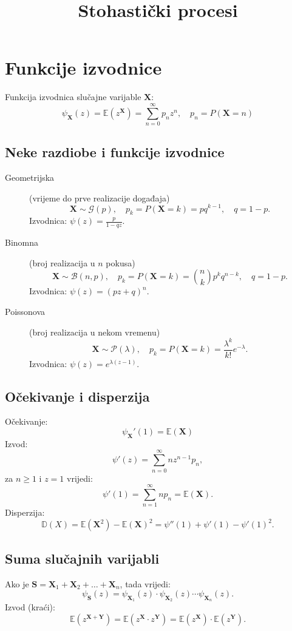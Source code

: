 \documentclass[12pt,english]{article}
\begin{document}
\title{Stohastički procesi}
\date{}
\maketitle

\section{Funkcije izvodnice}
Funkcija izvodnica slučajne varijable $\mathbf X$:
$$\psi_\mathbf{X}(z) = \mathbb{E} (z^\mathbf X) =
\sum_{n=0}^\infty p_n z^n, \quad p_n = P(\mathbf X = n)$$

\subsection{Neke razdiobe i funkcije izvodnice}
\begin{description}
  \item[Geometrijska] (vrijeme do prve realizacije događaja)
  $$\mathbf X \sim \mathcal G(p), \quad p_k = P(\mathbf X = k) = pq^{k-1}, \quad q = 1-p.$$
  Izvodnica: $\psi(z) = \frac{p}{1-qz}$.

  \item[Binomna] (broj realizacija u $n$ pokusa)
  $$\mathbf X \sim \mathcal B(n,p), \quad p_k = P(\mathbf X = k) = {n \choose k}p^k q^{n-k}, \quad q = 1-p.$$
  Izvodnica: $\psi(z) = (pz+q)^n$.

  \item[Poissonova] (broj realizacija u nekom vremenu)
  $$\mathbf X \sim \mathcal P(\lambda), \quad p_k = P(\mathbf X = k) = \frac{\lambda^k}{k!} e^{-\lambda}.$$
  Izvodnica: $\psi(z) = e^{\lambda (z-1)}$.

\end{description}

\subsection{Očekivanje i disperzija}
Očekivanje:
$$\psi_\mathbf X'(1) = \mathbb E(\mathbf X)$$
Izvod:
$$\psi'(z) = \sum_{n=0}^\infty n z ^{n-1}p_n,$$
za $n \geq 1$ i $z = 1$ vrijedi:
$$\psi'(1) = \sum_{n=1}^\infty n p_n = \mathbb E(\mathbf X).$$
Disperzija:
$$\mathbb D(X) = \mathbb E(\mathbf X^2) - \mathbb E(\mathbf X)^2 = \psi''(1)+\psi'(1)-\psi'(1)^2.$$

\subsection{Suma slučajnih varijabli}
Ako je $\mathbf S = \mathbf X_1 + \mathbf X_2 + \ldots + \mathbf X_n$, tada vrijedi:
$$\psi_\mathbf S (z) = \psi_{\mathbf X_1}(z) \cdot \psi_{\mathbf X_2}(z) \cdots \psi_{\mathbf X_n}(z).$$
Izvod (kraći):
$$\mathbb E(z^{\mathbf X + \mathbf Y}) = \mathbb E (z^\mathbf X \cdot z^\mathbf Y) = \mathbb E(z^\mathbf X) \cdot \mathbb E(z^\mathbf Y).$$
\end{document}
